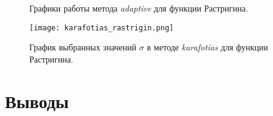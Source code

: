 \begin{figure}
  \centering
  \caption{ Графики работы метода \textit{adaptive} для функции Растригина.}
  \label{adaptive_rastrigin_plot}
\end{figure}

\begin{figure}
  \centering
  \texttt{[image: karafotias\_rastrigin.png]}
  \caption{График выбранных значений $\sigma$ в методе \textit{karafotias} для функции Растригина.}
  \label{karafotias_rastrigin}
\end{figure}

\section{Выводы}
